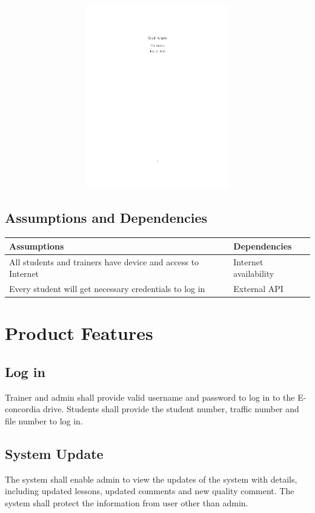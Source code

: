 \documentclass[a4paper]{article}
\begin{document}
\begin{figure}[h]
\includegraphics[width=12cm, height=8cm] {a1} 
\centering
\end{figure}

\bigskip
\subsection{Assumptions and Dependencies}
\begin{table}[ht]
\centering
\begin{tabular}{|p{5cm}|p{5cm}|}
\hline
Assumptions & Dependencies\\ \hline
All students and trainers have device and access to Internet & Internet availability\\ \hline
Every student will get necessary credentials to log in & External API \\
\hline
\end{tabular}
\end{table}


\bigskip
\section{Product Features}
\subsection{Log in}
Trainer and admin shall provide valid username and password to log in to the E-concordia drive. 
Students shall provide the student number, traffic number and file number to log in.
\bigskip
\subsection{System Update}
The system shall enable admin to view the updates of the system with details, including updated lessons, updated comments and new quality comment. The system shall protect the information from user other than admin.
\bigskip
\end{document}
